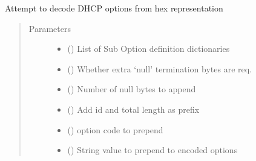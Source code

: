 \documentclass[letterpaper,10pt,english]{sphinxmanual}
\begin{document}
\begin{fulllineitems}

\begin{fulllineitems}
\label{\detokenize{dhcp_decode-class:bloxone.dhcp_decode.decode_dhcp_option}}
\sphinxAtStartPar
Attempt to decode DHCP options from hex representation
\begin{quote}\begin{description}
\item[{Parameters}] \leavevmode\begin{itemize}
\item {} 
\sphinxAtStartPar
{} () \textendash{} List of Sub Option definition dictionaries

\item {} 
\sphinxAtStartPar
{} () \textendash{} Whether extra ‘null’ termination bytes are req.

\item {} 
\sphinxAtStartPar
{} () \textendash{} Number of null bytes to append

\item {} 
\sphinxAtStartPar
{} () \textendash{} Add id and total length as prefix

\item {} 
\sphinxAtStartPar
{} () \textendash{} option code to prepend

\item {} 
\sphinxAtStartPar
{} () \textendash{} String value to prepend to encoded options


\end{itemize}
\end{description}
\end{quote}
\end{fulllineitems}
\end{fulllineitems}
\end{document}
